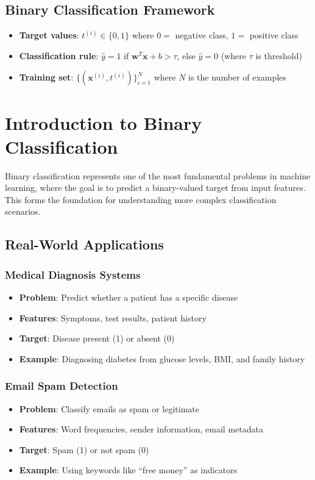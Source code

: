 \subsection{Binary Classification Framework}
\begin{itemize}
    \item \textbf{Target values}: $t^{(i)} \in \{0, 1\}$ where $0 =$ negative class, $1 =$ positive class
    \item \textbf{Classification rule}: $\hat{y} = 1$ if $\bm{w}^T\bm{x} + b > \tau$, else $\hat{y} = 0$ (where $\tau$ is threshold)
    \item \textbf{Training set}: $\{(\bm{x}^{(i)}, t^{(i)})\}_{i=1}^N$ where $N$ is the number of examples
\end{itemize}

\section{Introduction to Binary Classification}

Binary classification represents one of the most fundamental problems in machine learning, where the goal is to predict a binary-valued target from input features. This forms the foundation for understanding more complex classification scenarios.

\subsection{Real-World Applications}

\subsubsection{Medical Diagnosis Systems}
\begin{itemize}
    \item \textbf{Problem}: Predict whether a patient has a specific disease
    \item \textbf{Features}: Symptoms, test results, patient history
    \item \textbf{Target}: Disease present (1) or absent (0)
    \item \textbf{Example}: Diagnosing diabetes from glucose levels, BMI, and family history
\end{itemize}

\subsubsection{Email Spam Detection}
\begin{itemize}
    \item \textbf{Problem}: Classify emails as spam or legitimate
    \item \textbf{Features}: Word frequencies, sender information, email metadata
    \item \textbf{Target}: Spam (1) or not spam (0)
    \item \textbf{Example}: Using keywords like ``free money'' as indicators
\end{itemize}

